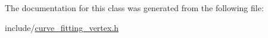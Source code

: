 The documentation for this class was generated from the following file\+:\begin{DoxyCompactItemize}
\item 
include/\hyperlink{curve__fitting__vertex_8h}{curve\+\_\+fitting\+\_\+vertex.\+h}\end{DoxyCompactItemize}
